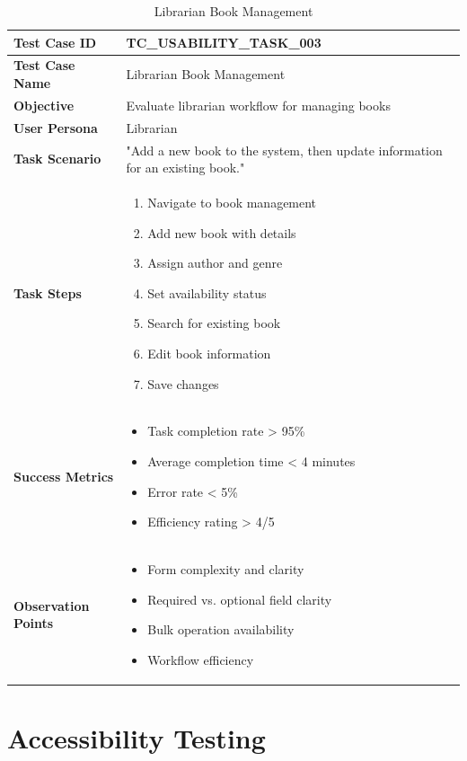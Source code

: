 \documentclass[12pt,a4paper]{article}
\begin{document}
\begin{longtable}{|p{3cm}|p{12cm}|}
\caption{Librarian Book Management} \\
\hline
\rowcolor{lightgray}
\textbf{Test Case ID} & \textbf{TC\_USABILITY\_TASK\_003} \\
\hline
\textbf{Test Case Name} & Librarian Book Management \\
\hline
\textbf{Objective} & Evaluate librarian workflow for managing books \\
\hline
\textbf{User Persona} & Librarian \\
\hline
\textbf{Task Scenario} & 
"Add a new book to the system, then update information for an existing book." \\
\hline
\textbf{Task Steps} & 
\begin{enumerate}[nosep]
    \item Navigate to book management
    \item Add new book with details
    \item Assign author and genre
    \item Set availability status
    \item Search for existing book
    \item Edit book information
    \item Save changes
\end{enumerate} \\
\hline
\textbf{Success Metrics} & 
\begin{itemize}[nosep]
    \item Task completion rate > 95\%
    \item Average completion time < 4 minutes
    \item Error rate < 5\%
    \item Efficiency rating > 4/5
\end{itemize} \\
\hline
\textbf{Observation Points} & 
\begin{itemize}[nosep]
    \item Form complexity and clarity
    \item Required vs. optional field clarity
    \item Bulk operation availability
    \item Workflow efficiency
\end{itemize} \\
\hline
\end{longtable}

\section{Accessibility Testing}
\end{document}

